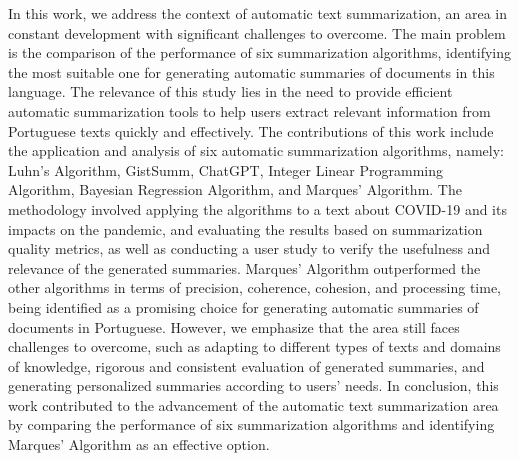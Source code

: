 In this work, we address the context of automatic text summarization, an area in constant development with significant challenges to overcome. The main problem is the comparison of the performance of six summarization algorithms, identifying the most suitable one for generating automatic summaries of documents in this language. The relevance of this study lies in the need to provide efficient automatic summarization tools to help users extract relevant information from Portuguese texts quickly and effectively.
The contributions of this work include the application and analysis of six automatic summarization algorithms, namely: Luhn's Algorithm, GistSumm, ChatGPT, Integer Linear Programming Algorithm, Bayesian Regression Algorithm, and Marques' Algorithm. The methodology involved applying the algorithms to a text about COVID-19 and its impacts on the pandemic, and evaluating the results based on summarization quality metrics, as well as conducting a user study to verify the usefulness and relevance of the generated summaries.
Marques' Algorithm outperformed the other algorithms in terms of precision, coherence, cohesion, and processing time, being identified as a promising choice for generating automatic summaries of documents in Portuguese. However, we emphasize that the area still faces challenges to overcome, such as adapting to different types of texts and domains of knowledge, rigorous and consistent evaluation of generated summaries, and generating personalized summaries according to users' needs.
In conclusion, this work contributed to the advancement of the automatic text summarization area by comparing the performance of six summarization algorithms and identifying Marques' Algorithm as an effective option. 

